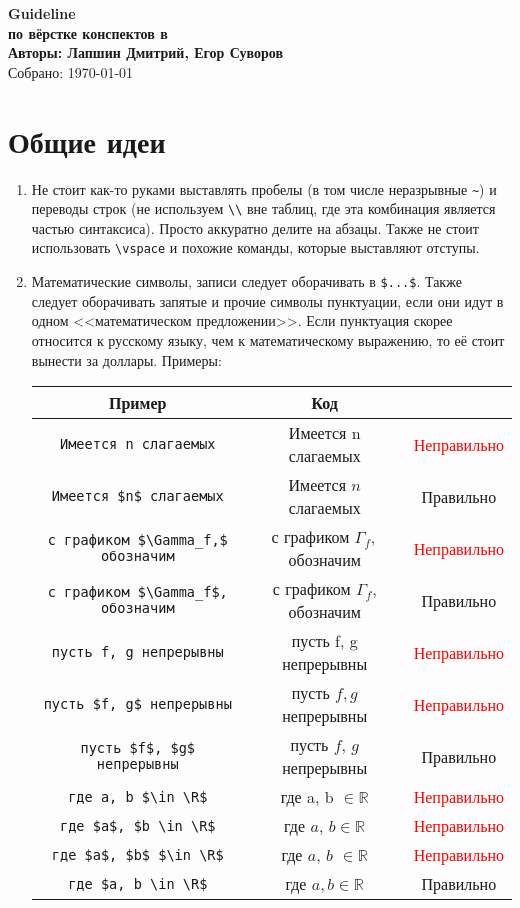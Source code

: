 \documentclass[12pt,a4paper]{book}
\def\R{\mathbb{R}}
\newcommand{\ok}{& \textcolor{green!60!black}{Правильно}}
\newcommand{\bad}{& \textcolor{red}{Неправильно}}
\begin{document}
\begin{center}
{\huge \bf Guideline} \\
{\Large \bf по вёрстке конспектов в \XeLaTeX} \\
\vspace{0.5em}
{\large \bf Авторы: Лапшин Дмитрий, Егор Суворов} \\
\vspace{0.5em}
{Собрано: \today~\currenttime} \\
\end{center}

\section{Общие идеи}
\begin{enumerate}
\item Не стоит как-то руками выставлять пробелы (в том числе неразрывные \verb'~') и переводы строк (не используем \verb'\\' вне таблиц,
где эта комбинация является частью синтаксиса). Просто аккуратно делите на абзацы. Также не стоит
использовать \verb`\vspace` и похожие команды, которые выставляют отступы.

\item Математические символы, записи следует оборачивать в \verb'$...$'. Также следует оборачивать запятые
и прочие символы пунктуации, если они идут в одном <<математическом предложении>>. Если пунктуация
скорее относится к русскому языку, чем к математическому выражению, то её стоит вынести за доллары. Примеры:

\begin{center}\begin{tabular}{|c|c|c|}
\hline Пример & Код & \\
\hline \verb!Имеется n слагаемых! & Имеется n слагаемых \bad \\
\hline \verb!Имеется $n$ слагаемых! & Имеется $n$ слагаемых \ok \\
\hline \verb!с графиком $\Gamma_f,$ обозначим! & с графиком $\Gamma_f,$ обозначим \bad \\
\hline \verb!с графиком $\Gamma_f$, обозначим! & с графиком $\Gamma_f$, обозначим \ok \\
\hline \verb!пусть f, g непрерывны! & пусть f, g непрерывны \bad \\
\hline \verb!пусть $f, g$ непрерывны! & пусть $f, g$ непрерывны \bad \\
\hline \verb!пусть $f$, $g$ непрерывны! & пусть $f$, $g$ непрерывны \ok \\
\hline \verb!где a, b $\in \R$! & где a, b $\in \R$ \bad \\
\hline \verb!где $a$, $b \in \R$! & где $a$, $b \in \R$ \bad \\
\hline \verb!где $a$, $b$ $\in \R$! & где $a$, $b$ $\in \R$ \bad \\
\hline \verb!где $a, b \in \R$! & где $a, b \in \R$ \ok \\
\hline 
\end{tabular}\end{center}


\end{enumerate}
\end{document}
